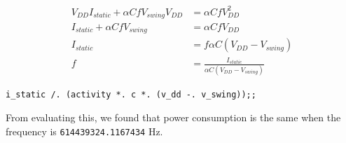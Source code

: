 \documentclass[hidelinks, 12pt]{article}
\begin{document}
\begin{align*}
  V_{DD} I_{static} + \alpha C f V_{swing} V_{DD} &= \alpha C f V_{DD}^{2} \\
  I_{static} + \alpha C f V_{swing} &= \alpha C f V_{DD} \\
  I_{static} &= f \alpha C \left( V_{DD} - V_{swing} \right) \\
  f &= \frac{I_{static}}{\alpha C \left( V_{DD} - V_{swing} \right)}
\end{align*}

\begin{lstlisting}[frame=single,basicstyle=\ttfamily,keywordstyle=\color{black}\bfseries\underbar,language={[Objective]Caml},label=lst-same-power-freq,caption={The code that will evaluate the frequency where the power consumption is the same.},captionpos=b,numbers=none]
i_static /. (activity *. c *. (v_dd -. v_swing));;
\end{lstlisting}

From evaluating this, we found that power consumption is the same when the frequency is \texttt{614439324.1167434} \unit{\hertz}.
\end{document}
